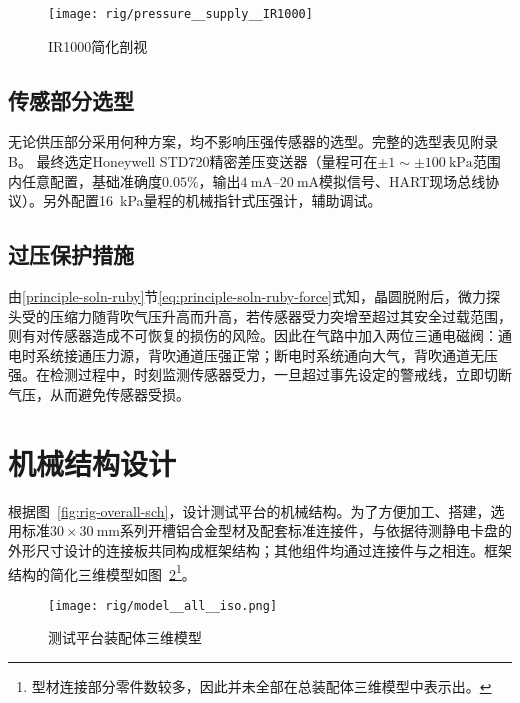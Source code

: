\begin{figure}[tbhp]
\centering
\texttt{[image: rig/pressure\_\_supply\_\_IR1000]}
\caption{IR1000简化剖视}
\label{fig:rig-pressure-supply-ir1000}
\end{figure}


\subsection{传感部分选型}\label{sec:rig-pressure-sensor}

无论供压部分采用何种方案，均不影响压强传感器的选型。完整的选型表见附录B。
最终选定Honeywell STD720精密差压变送器（量程可在$\pm \num{1} \sim \pm \SI{100}{\kilo\pascal}$范围内任意配置，基础准确度$0.05\%$，输出$\SIrange{4}{20}{\milli\ampere}$模拟信号、HART现场总线协议）。另外配置\SI{16}{\kilo\pascal}量程的机械指针式压强计，辅助调试。


\subsection{过压保护措施}\label{sec:rig-pressure-valve}

由\ref{principle-soln-ruby}节\eqref{eq:principle-soln-ruby-force}式知，晶圆脱附后，微力探头受的压缩力随背吹气压升高而升高，若传感器受力突增至超过其安全过载范围，则有对传感器造成不可恢复的损伤的风险。因此在气路中加入两位三通电磁阀：通电时系统接通压力源，背吹通道压强正常；断电时系统通向大气，背吹通道无压强。在检测过程中，时刻监测传感器受力，一旦超过事先设定的警戒线，立即切断气压，从而避免传感器受损。



\clearpage



\section{机械结构设计}\label{sec:rig-model}

根据图~\ref{fig:rig-overall-sch}，设计测试平台的机械结构。为了方便加工、搭建，选用标准$\num{30} \times \SI{30}{\milli\meter}$系列开槽铝合金型材及配套标准连接件，与依据待测静电卡盘的外形尺寸设计的连接板共同构成框架结构；其他组件均通过连接件与之相连。框架结构的简化三维模型如图~\ref{fig:rig-model-all-iso}\footnote{型材连接部分零件数较多，因此并未全部在总装配体三维模型中表示出。}。

\begin{figure}[p]
\centering
\texttt{[image: rig/model\_\_all\_\_iso.png]}
\caption{测试平台装配体三维模型}
\label{fig:rig-model-all-iso}
\end{figure}


